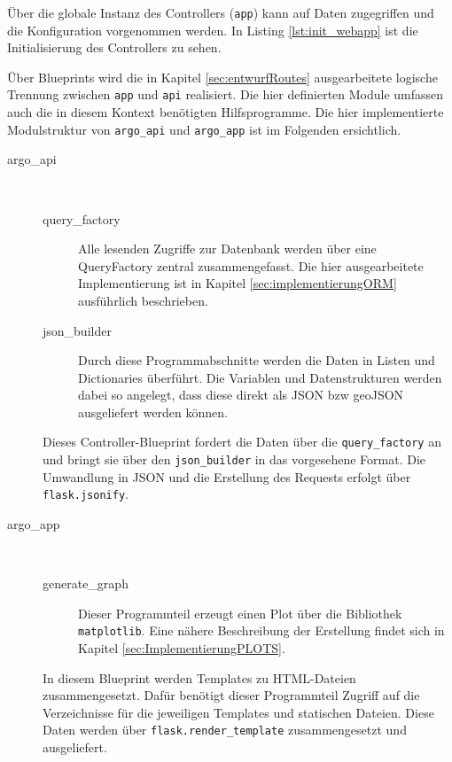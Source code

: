 

Über die globale Instanz des \gls{Controller}s (\texttt{app}) kann auf Daten zugegriffen und die Konfiguration vorgenommen werden. In Listing \ref{lst:init_webapp} ist die Initialisierung des \gls{Controller}s zu sehen.

Über Blueprints wird die in Kapitel \ref{sec:entwurfRoutes} ausgearbeitete logische Trennung zwischen \texttt{app} und \texttt{api} realisiert. Die hier definierten Module umfassen auch die in diesem Kontext benötigten Hilfsprogramme. Die hier implementierte Modulstruktur von \texttt{argo\_api} und \texttt{argo\_app} ist im Folgenden ersichtlich.

\begin{description}
 \item [argo\_api] $ $

    \begin{description}
     \item [query\_factory]
        Alle lesenden Zugriffe zur Datenbank werden über eine QueryFactory zentral zusammengefasst. Die hier ausgearbeitete Implementierung ist in Kapitel \ref{sec:implementierungORM} ausführlich beschrieben.

     \item [json\_builder]
        Durch diese Programmabschnitte werden die Daten in Listen und Dictionaries überführt. Die Variablen und Datenstrukturen werden dabei so angelegt, dass diese direkt als JSON bzw geoJSON ausgeliefert werden können.
    \end{description}

    Dieses \gls{Controller}-Blueprint fordert die Daten über die \texttt{query\_factory} an und bringt sie über den \texttt{json\_builder} in das vorgesehene Format.  Die Umwandlung in JSON und die Erstellung des Requests erfolgt über \texttt{flask.jsonify}.
\pagebreak
 \item [argo\_app] $ $

    \begin{description}
     \item [generate\_graph] Dieser Programmteil erzeugt einen Plot über die Bibliothek \texttt{matplotlib}. Eine nähere Beschreibung der Erstellung findet sich in Kapitel \ref{sec:ImplementierungPLOTS}.
    \end{description}

    In diesem Blueprint werden Templates zu HTML-Dateien zusammengesetzt. Dafür benötigt dieser Programmteil Zugriff auf die Verzeichnisse für die jeweiligen Templates und statischen Dateien. Diese Daten werden über \texttt{flask.render\_template} zusammengesetzt und ausgeliefert.
\end{description}

